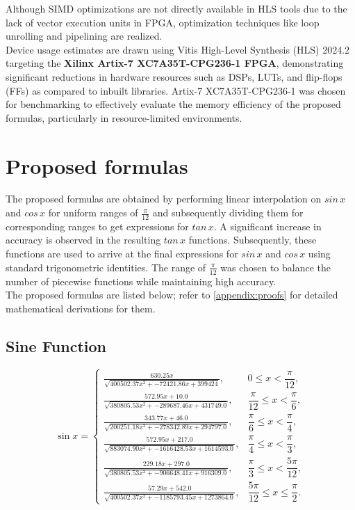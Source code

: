 \documentclass[12pt,twoside, letterpaper, margin=1in]{article}
\begin{document}
Although SIMD optimizations are not directly available in HLS tools due to the lack of vector execution units in FPGA, optimization techniques like loop unrolling and pipelining are realized.\\
Device usage estimates are drawn using Vitis High-Level Synthesis (HLS) 2024.2 targeting the \textbf{Xilinx Artix-7 XC7A35T-CPG236-1 FPGA}, demonstrating significant reductions in hardware resources such as DSPs, LUTs, and flip-flops (FFs) as compared to inbuilt libraries. Artix-7 XC7A35T-CPG236-1 was chosen for benchmarking to effectively evaluate the memory efficiency of the proposed formulas, particularly in resource-limited environments.


\section{Proposed formulas}
\label{sec:proposed}
The proposed formulas are obtained by performing linear interpolation on $sin\,x$ and $cos\,x$ for uniform ranges of $\frac{\pi}{12}$ and subsequently dividing them for corresponding ranges to get expressions for $tan\,x$. A significant increase in accuracy is observed in the resulting $tan\,x$ functions. Subsequently, these functions are used to arrive at the final expressions for $sin\,x$ and $cos\,x$ using standard trigonometric identities. The range of $\frac{\pi}{12}$ was chosen to balance the number of piecewise functions while maintaining high accuracy.\\
The proposed formulas are listed below; refer to \autoref{appendix:proofs} for detailed mathematical derivations for them.

\subsection*{Sine Function}
\[
\sin x =
\begin{cases}
\displaystyle \frac{630.25 x}{\sqrt{400502.37 x^2 +-72421.86 x + 399424}}, & 0 \le x < \dfrac{\pi}{12}, \\[3ex]
\displaystyle \frac{572.95 x + 10.0}{\sqrt{380805.53 x^2 + -289687.46 x +431749.0}}, & \dfrac{\pi}{12} \le x < \dfrac{\pi}{6}, \\[3ex]
\displaystyle \frac{343.77 x +  46.0}{\sqrt{200251.18 x^2 + -278342.89 x + 294797.0}}, & \dfrac{\pi}{6} \le x < \dfrac{\pi}{4}, \\[3ex]
\displaystyle \frac{572.95 x + 217.0}{\sqrt{883074.90 x^2 + -1616428.53 x + 1614593.0}}, & \dfrac{\pi}{4} \le x < \dfrac{\pi}{3}, \\[3ex]
\displaystyle \frac{229.18 x + 297.0}{\sqrt{380805.53 x^2 + -906648.41 x + 916309.0}}, & \dfrac{\pi}{3} \le x < \dfrac{5\pi}{12}, \\[3ex]
\displaystyle \frac{57.29 x + 542.0}{\sqrt{400502.37 x^2 + -1185793.45 x + 1273864.0}}, & \dfrac{5\pi}{12} \le x \le \dfrac{\pi}{2}.
\end{cases}
\]
\end{document}
